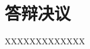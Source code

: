 
\setlength{\baselineskip}{16pt}
\chapter{答辩决议}
\setlength{\parindent}{0pt}

\hspace{2em}XXXXXXXXXXXXX





